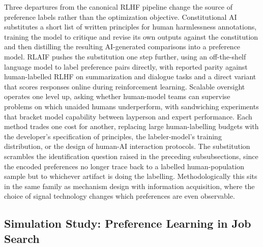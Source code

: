 Three departures from the canonical RLHF pipeline change the source of preference labels rather than the optimization objective. Constitutional AI \citep{bai2022constitutional} substitutes a short list of written principles for human harmlessness annotations, training the model to critique and revise its own outputs against the constitution and then distilling the resulting AI-generated comparisons into a preference model. RLAIF \citep{lee2023rlaif} pushes the substitution one step further, using an off-the-shelf language model to label preference pairs directly, with reported parity against human-labelled RLHF on summarization and dialogue tasks and a direct variant that scores responses online during reinforcement learning. Scalable oversight \citep{bowman2022oversight} operates one level up, asking whether human-model teams can supervise problems on which unaided humans underperform, with sandwiching experiments that bracket model capability between layperson and expert performance. Each method trades one cost for another, replacing large human-labelling budgets with the developer's specification of principles, the labeler-model's training distribution, or the design of human-AI interaction protocols. The substitution scrambles the identification question raised in the preceding subsubsections, since the encoded preferences no longer trace back to a labelled human-population sample but to whichever artifact is doing the labelling. Methodologically this sits in the same family as mechanism design with information acquisition, where the choice of signal technology changes which preferences are even observable.

\subsection{Simulation Study: Preference Learning in Job Search}

